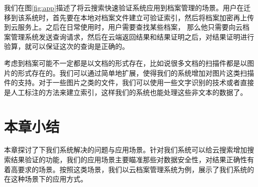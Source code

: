 我们在图\ref{fig:app}描述了将云搜索快速验证系统应用到档案管理的场景。用户在迁移到该系统时，首先要在本地对档案文件建立可验证索引，然后将档案加密再上传到云服务上。之后在日常使用时，用户需要查找某些档案，
那么他只需要向云档案管理系统发送查询请求，然后在云端返回结果和结果证明之后，对结果证明进行验算，就可以保证这次的查询是正确的。

考虑到档案可能不一定都是以文档的形式存在，比如说很多文档的扫描件都是以图片的形式存在的。我们可以通过简单地扩展，使得我们的系统增加对图片这类扫描件的支持。对于一些图片之类的文件，我们可以使用一些文字识别的技术或者直接是人工标注的方法来建立索引，这样我们的系统也能处理这些非文本的数据了。

\section{本章小结}
本章探讨了下我们系统解决的问题与应用场景。针对我们系统可以给云搜索增加搜索结果验证的功能，我们的应用场景主要瞄准那些对数据安全性，对结果正确性有着高要求的场景。按照这类场景，我们以云档案管理系统为例，展示了我们系统的在这种场景下的应用方式。
